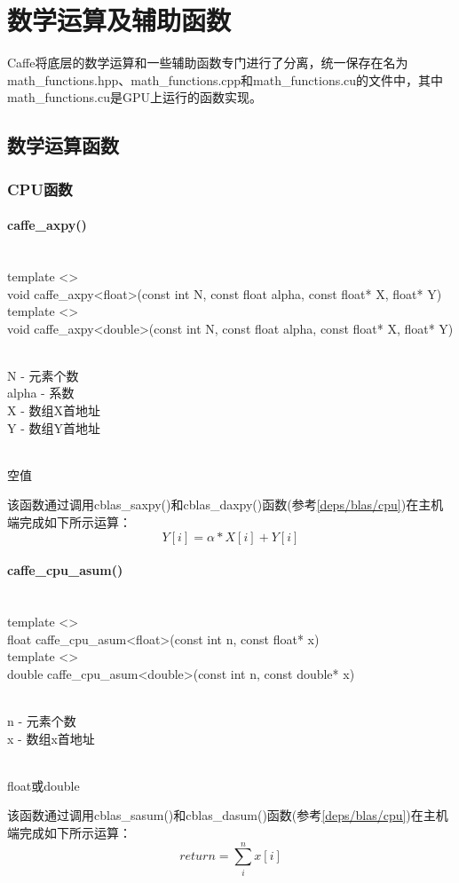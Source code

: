 \chapter{数学运算及辅助函数}
Caffe将底层的数学运算和一些辅助函数专门进行了分离，统一保存在名为math\_functions.hpp、math\_functions.cpp和math\_functions.cu的文件中，其中math\_functions.cu是GPU上运行的函数实现。
\section{数学运算函数}
\subsection{CPU函数}\label{math/cpu/alg}
\subsubsection{caffe\_axpy()}
\begin{cnfrmfunc}
   \item{}\\
     template <>\\
     void caffe\_axpy<float>(const int N, const float alpha, const float* X, float* Y)\\
     
     template <>\\
     void caffe\_axpy<double>(const int N, const float alpha, const float* X, float* Y)
   \item{}\\
     N - 元素个数\\
     alpha - 系数\\
     X - 数组X首地址\\
     Y - 数组Y首地址
   \item{}\\
     空值
\end{cnfrmfunc}
该函数通过调用cblas\_saxpy()和cblas\_daxpy()函数(参考\ref{deps/blas/cpu})在主机端完成如下所示运算：
$$
Y[i] = \alpha * X[i] + Y[i]
$$
\subsubsection{caffe\_cpu\_asum()}
\begin{cnfrmfunc}
   \item{}\\
     template <>\\
     float caffe\_cpu\_asum<float>(const int n, const float* x)\\

     template <>\\
     double caffe\_cpu\_asum<double>(const int n, const double* x)
   \item{}\\
     n - 元素个数\\
     x - 数组x首地址
   \item{}\\
     float或double
\end{cnfrmfunc}
该函数通过调用cblas\_sasum()和cblas\_dasum()函数(参考\ref{deps/blas/cpu})在主机端完成如下所示运算：
$$
return = \sum\limits_{i}^{n} x[i]
$$
